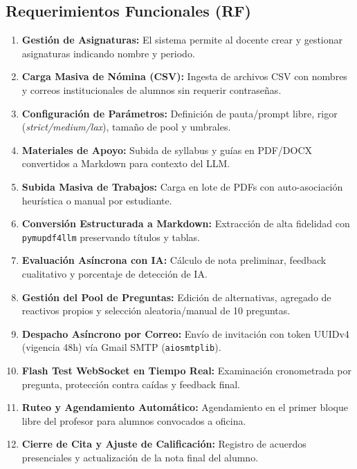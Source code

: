 \documentclass[11pt,a4paper]{article}
\begin{document}
\subsection{Requerimientos Funcionales (RF)}
\begin{enumerate}[label=\textbf{RF\arabic*.}]
    \item \textbf{Gestión de Asignaturas:} El sistema permite al docente crear y gestionar asignaturas indicando nombre y periodo.
    \item \textbf{Carga Masiva de Nómina (CSV):} Ingesta de archivos CSV con nombres y correos institucionales de alumnos sin requerir contraseñas.
    \item \textbf{Configuración de Parámetros:} Definición de pauta/prompt libre, rigor (\textit{strict/medium/lax}), tamaño de pool y umbrales.
    \item \textbf{Materiales de Apoyo:} Subida de syllabus y guías en PDF/DOCX convertidos a Markdown para contexto del LLM.
    \item \textbf{Subida Masiva de Trabajos:} Carga en lote de PDFs con auto-asociación heurística o manual por estudiante.
    \item \textbf{Conversión Estructurada a Markdown:} Extracción de alta fidelidad con \texttt{pymupdf4llm} preservando títulos y tablas.
    \item \textbf{Evaluación Asíncrona con IA:} Cálculo de nota preliminar, feedback cualitativo y porcentaje de detección de IA.
    \item \textbf{Gestión del Pool de Preguntas:} Edición de alternativas, agregado de reactivos propios y selección aleatoria/manual de 10 preguntas.
    \item \textbf{Despacho Asíncrono por Correo:} Envío de invitación con token UUIDv4 (vigencia 48h) vía Gmail SMTP (\texttt{aiosmtplib}).
    \item \textbf{Flash Test WebSocket en Tiempo Real:} Examinación cronometrada por pregunta, protección contra caídas y feedback final.
    \item \textbf{Ruteo y Agendamiento Automático:} Agendamiento en el primer bloque libre del profesor para alumnos convocados a oficina.
    \item \textbf{Cierre de Cita y Ajuste de Calificación:} Registro de acuerdos presenciales y actualización de la nota final del alumno.
\end{enumerate}
\end{document}

